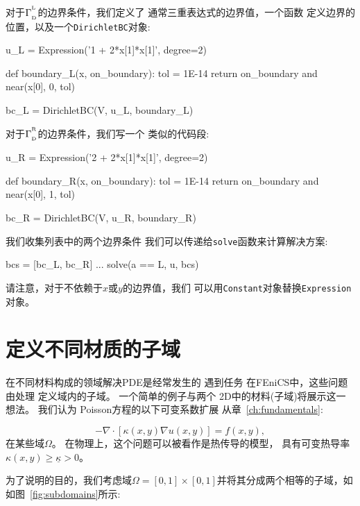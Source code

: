 对于$\Gamma_{_\mathrm{D}}^{^{\mathrm{L}}}$的边界条件，我们定义了
通常三重表达式的边界值，一个函数
定义边界的位置，以及一个\texttt{DirichletBC}对象:

\begin{python}
u_L = Expression('1 + 2*x[1]*x[1]', degree=2)

def boundary_L(x, on_boundary):
    tol = 1E-14
    return on_boundary and near(x[0], 0, tol)

bc_L = DirichletBC(V, u_L, boundary_L)
\end{python}
对于$\Gamma_{_\mathrm{D}}^{^{\mathrm{R}}}$的边界条件，我们写一个
类似的代码段:

\begin{python}
u_R = Expression('2 + 2*x[1]*x[1]', degree=2)

def boundary_R(x, on_boundary):
    tol = 1E-14
    return on_boundary and near(x[0], 1, tol)

bc_R = DirichletBC(V, u_R, boundary_R)
\end{python}
我们收集列表中的两个边界条件
我们可以传递给\texttt{solve}函数来计算解决方案:

\begin{python}
bcs = [bc_L, bc_R]
...
solve(a == L, u, bcs)
\end{python}

请注意，对于不依赖于$x$或$y$的边界值，我们
可以用\texttt{Constant}对象替换\texttt{Expression}对象。

\section{定义不同材质的子域}
\label{ftut:possion:2D:2mat:impl}


在不同材料构成的领域解决PDE是经常发生的
遇到任务 在FEniCS中，这些问题由处理
定义域内的子域。 一个简单的例子与两个
2D中的材料(子域)将展示这一想法。 我们认为
Poisson方程的以下可变系数扩展
从章~\ref{ch:fundamentals}:

\begin{equation} \label{ch:poisson0:2D:2mat:varcoeff2}
  -\nabla \cdot \left\lbrack \kappa(x,y)\nabla u(x,y)\right\rbrack =
  f(x, y),
\end{equation}
在某些域$\Omega$。
在物理上，这个问题可以被看作是热传导的模型，
具有可变热导率$\kappa(x,y) \geq
\underline{\kappa} > 0$。

为了说明的目的，我们考虑域$\Omega =
[0,1]\times [0,1]$并将其分成两个相等的子域，如
如图~\ref{fig:subdomains}所示:

